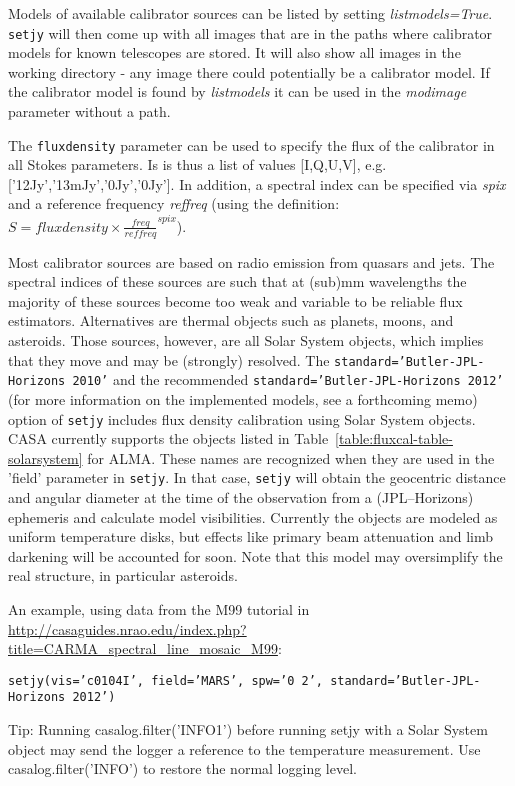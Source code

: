 Models of available calibrator sources can be listed by setting {\it
  listmodels=True}. {\tt setjy} will then come up with all images
that are in the paths where calibrator models for known telescopes are
stored. It will also show all images in the working directory - any
image there could potentially be a calibrator model. If the calibrator
model is found by {\it listmodels} it can be used in the {\it
  modimage} parameter without a path.

The {\tt fluxdensity} parameter can be used to specify the flux of the
calibrator in all Stokes parameters. Is is thus a list of values
[I,Q,U,V], e.g. ['12Jy','13mJy','0Jy','0Jy']. In addition, a spectral
index can be specified via {\it spix} and a reference frequency {\it
  reffreq} (using the definition: $S = fluxdensity\times\frac{
  freq}{reffreq}^{spix}$).


Most calibrator sources are based on radio emission from quasars and
jets. The spectral indices of these sources are such that at (sub)mm
wavelengths the majority of these sources become too weak and variable
to be reliable flux estimators. Alternatives are thermal objects such
as planets, moons, and asteroids. Those sources, however, are all
Solar System objects, which implies that they move and may be
(strongly) resolved. The {\tt standard='Butler-JPL-Horizons 2010'} and
the recommended {\tt  standard='Butler-JPL-Horizons 2012'} (for more
information on the implemented models, see a forthcoming memo)
option of {\tt setjy} includes flux density calibration using Solar
System objects. CASA currently supports the objects listed in
Table~\ref{table:fluxcal-table-solarsystem} for ALMA. These names are
recognized when they are used in the 'field' parameter in {\tt setjy}.
In that case, {\tt setjy} will obtain the geocentric distance and
angular diameter at the time of the observation from a (JPL--Horizons)
ephemeris and calculate model visibilities.  Currently the objects are
modeled as uniform temperature disks, but effects like primary beam
attenuation and limb darkening will be accounted for soon. Note that
this model may oversimplify the real structure, in particular
asteroids.

An example, using data from the M99 tutorial in 
\url{http://casaguides.nrao.edu/index.php?title=CARMA_spectral_line_mosaic_M99}:

{\tt setjy(vis='c0104I', field='MARS', spw='0~2', standard='Butler-JPL-Horizons 2012')}

Tip: Running casalog.filter('INFO1') before running setjy with a Solar
System object may send the logger a reference to the temperature
measurement.  Use casalog.filter('INFO') to restore the normal logging
level.


